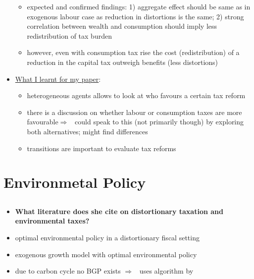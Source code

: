\documentclass[12pt]{article}
\newcommand{\ar}{$\Rightarrow$ \ }
\begin{document}
\begin{itemize}
\begin{itemize}
\item expected and confirmed findings: 1) aggregate effect should be same as in exogenous labour case as reduction in distortions is the same; 2) strong correlation between wealth and consumption should imply less redistribution of tax burden
\item however, even with consumption tax rise the cost (redistribution) of a reduction in the capital tax outweigh benefits (less distortions)
\end{itemize}
\item \underline{What I learnt for my paper}:
\begin{itemize}
\item heterogeneous agents allows to look at who favours a certain tax reform
\item there is a discussion on whether labour or consumption taxes are more favourable\ar could speak to this (not primarily though) by exploring both alternatives; might find differences
\item transitions are important to evaluate tax reforms
\end{itemize}
\end{itemize}



\section{Environmetal Policy}
\hypertarget{env}{}
\localtableofcontents
\subsection{\cite{Barrage2019OptimalPolicy} }
\begin{itemize}
	\item \textbf{What literature does she cite on distortionary taxation and environmental taxes?}
	\item optimal environmental policy in a distortionary fiscal setting
	\item exogenous growth model with optimal environmental policy 
	\item due to carbon cycle no BGP exists \ar uses algorithm by \cite{Jones1993OptimalGrowth}
\end{itemize}
\end{document}
